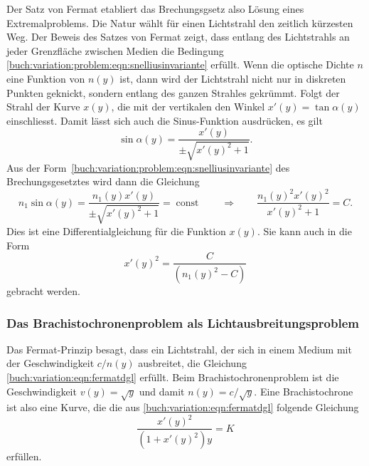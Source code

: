 Der Satz von Fermat etabliert das Brechungsgsetz also Lösung eines
Extremalproblems.
Die Natur wählt für einen Lichtstrahl den zeitlich kürzesten Weg.
Der Beweis des Satzes von Fermat zeigt, dass entlang des Lichtstrahls
an jeder Grenzfläche zwischen Medien die Bedingung
\eqref{buch:variation:problem:eqn:snelliusinvariante}
erfüllt.
Wenn die optische Dichte $n$ eine Funktion von $n(y)$ ist, dann
wird der Lichtstrahl nicht nur in diskreten Punkten geknickt, sondern
entlang des ganzen Strahles gekrümmt.
Folgt der Strahl der Kurve $x(y)$, die mit der vertikalen den Winkel
$x'(y) = \tan\alpha(y)$ einschliesst.
Damit lässt sich auch die Sinus-Funktion ausdrücken, es gilt
\[
\sin\alpha(y)
=
\frac{x'(y)}{\pm\!\sqrt{x'(y)^2+1}}.
\]
Aus der Form~\eqref{buch:variation:problem:eqn:snelliusinvariante}
des Brechungsgesetztes wird dann die Gleichung
\begin{equation}
n_1\sin\alpha(y)
=
\frac{n_1(y)x'(y)}{\pm\!\sqrt{x'(y)^2+1}}
=
\operatorname{const}
\qquad\Rightarrow\qquad
\frac{n_1(y)^2x'(y)^2}{x'(y)^2+1}=C.
\label{buch:variation:eqn:fermatdgl}
\end{equation}
Dies ist eine Differentialgleichung für die Funktion $x(y)$.
Sie kann auch in die Form
\[
x'(y)^2
=
\frac{C}{(n_1(y)^2-C)}
\]
gebracht werden.

%
%
\subsubsection{Das Brachistochronenproblem als Lichtausbreitungsproblem}
Das Fermat-Prinzip besagt, dass ein Lichtstrahl, der sich in einem Medium
mit der Geschwindigkeit $c/n(y)$ ausbreitet, die Gleichung 
\eqref{buch:variation:eqn:fermatdgl} erfüllt.
Beim Brachistochronenproblem ist die Geschwindigkeit $v(y)=\!\sqrt{y}$ und 
damit $n(y) = c/\!\sqrt{y}$.
Eine Brachistochrone ist also eine Kurve, die die aus
\eqref{buch:variation:eqn:fermatdgl} folgende Gleichung
\begin{equation}
\frac{x'(y)^2}{(1+x'(y)^2)y} = K
\label{buch:variation:problem:eqn:bernoullidgl}
\end{equation}
erfüllen.

%
%
